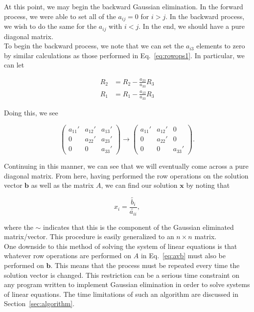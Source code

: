 \documentclass[12pt]{article}
\numberwithin{equation}{section}
\begin{document}
At this point, we may begin the backward Gaussian elimination.  In the forward process, we were able to set all of the $a_{ij}=0$ for $i>j$.  In the backward process, we wish to do the same for the $a_{ij}$ with $i<j$.  In the end, we should have a pure diagonal matrix.
\\\indent To begin the backward process, we note that we can set the $a_{i3}$ elements to zero by similar calculations as those performed in Eq.~\ref{eq:rowops1}.  In particular, we can let 

\begin{equation}
\label{eq:rowops2}
\begin{align}
R_{2} &= R_{2} - \frac{a_{23}}{a_{33}}R_{3} \\
R_{1} &= R_{1} - \frac{a_{13}}{a_{33}}R_{3}
\end{align}
\end{equation}

\noindent Doing this, we see 

\begin{equation}
\left(
\begin{array}{ccc}
a_{11}\prime & a_{12}\prime & a_{13}\prime \\
0 & a_{22}\prime & a_{23}\prime \\
0 & 0 & a_{33}\prime
\end{array}\right) \rightarrow
\left(\begin{array}{ccc}
a_{11}\prime & a_{12}\prime & 0 \\
0 & a_{22}\prime & 0 \\
0 & 0 & a_{33}\prime 
\end{array}\right).
\end{equation}

\noindent Continuing in this manner, we can see that we will eventually come across a pure diagonal matrix.  From here, having performed the row operations on the solution vector $\textbf{b}$ as well as the matrix $A$, we can find our solution $\textbf{x}$ by noting that 

\begin{equation}
x_{i} = \frac{\widetilde{b_{i}}}{\widetilde{a_{ii}}},
\end{equation}

\noindent where the $\sim$ indicates that this is the component of the Gaussian eliminated matrix/vector.  This procedure is easily generalized to an $n\times n$ matrix.
\\\indent One downside to this method of solving the system of linear equations is that whatever row operations are performed on $A$ in Eq.~\ref{eq:avb} must also be performed on $\textbf{b}$.  This means that the process must be repeated every time the solution vector is changed.  This restriction can be a serious time constraint on any program written to implement Gaussian elimination in order to solve systems of linear equations.  The time limitations of such an algorithm are discussed in Section~\ref{sec:algorithm}.
\end{document}

